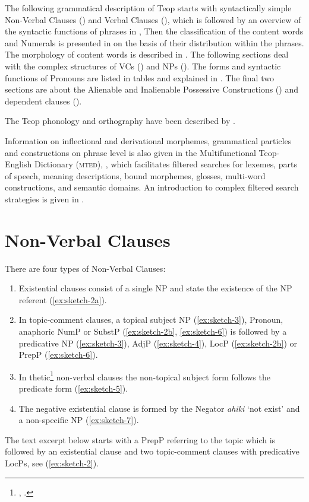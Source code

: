 \documentclass[output=paper]{langscibook}
\begin{document}
The following grammatical description of Teop starts with syntactically simple Non-Verbal Clauses () and Verbal Clauses (), which is followed by an overview of the syntactic functions of phrases in , Then the classification of the content words and Numerals is presented in  on the basis of their distribution within the phrases. The morphology of content words is described in . The following sections deal with the complex structures of VCs () and NPs (). The forms and syntactic functions of Pronouns are listed in tables and explained in . The final two sections are about the Alienable and Inalienable Possessive Constructions () and dependent clauses ().

The Teop phonology and orthography have been described by \textcite{Radtke:2005kw}.

Information on inflectional and derivational morphemes, grammatical particles and constructions on phrase level is also given in the Multifunctional Teop-English Dictionary (\textsc{mted}), \textcite{Mosel:2019bt}, which facilitates filtered searches for lexemes, parts of speech, meaning descriptions, bound morphemes, glosses, multi-word constructions, and semantic domains. An introduction to complex filtered search strategies is given in .
\section{Non-Verbal Clauses}\label{sec:nonverbal}
There are four types of Non-Verbal Clauses:
\begin{enumerate}
    \item Existential clauses consist of a single NP and state the existence of the NP referent (\ref{ex:sketch-2a}).
    \item In topic-comment clauses, a topical subject NP (\ref{ex:sketch-3}), Pronoun, anaphoric NumP or SubstP (\ref{ex:sketch-2b}, \ref{ex:sketch-6}) is followed by a predicative NP (\ref{ex:sketch-3}), AdjP (\ref{ex:sketch-4}), LocP (\ref{ex:sketch-2b}) or PrepP (\ref{ex:sketch-6}).
    \item In thetic\footnote{\textcite[137--146]{Lambrecht:1994od}, \textcite{Sasse:1987yh}.} non-verbal clauses the non-topical subject form follows the predicate form (\ref{ex:sketch-5}). 
    \item The negative existential clause is formed by the Negator \textit{ahiki} `not exist' and a non-specific NP (\ref{ex:sketch-7}).
\end{enumerate}
The text excerpt below starts with a PrepP referring to the topic which is followed by an existential clause and two topic-comment clauses with predicative LocPs, see (\ref{ex:sketch-2}).
\end{document}
